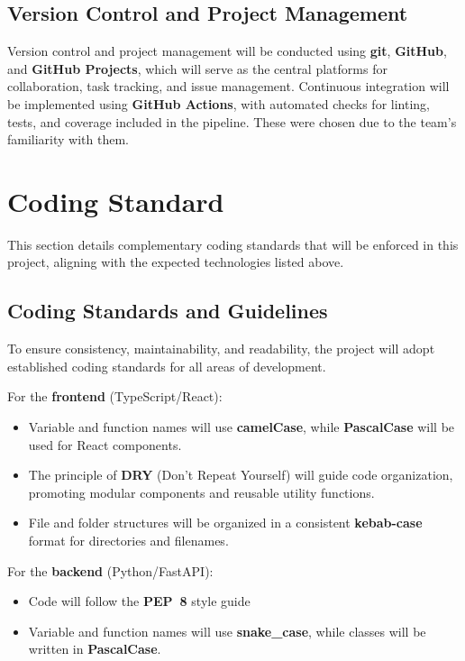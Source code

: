 \documentclass{article}
\begin{document}
\subsection{Version Control and Project Management}

Version control and project management will be conducted using \textbf{git}, \textbf{GitHub}, and \textbf{GitHub Projects}, which will serve as the central platforms for collaboration, task tracking, and issue management. Continuous integration will be implemented using \textbf{GitHub Actions}, with automated checks for linting, tests, and coverage included in the pipeline. These were chosen due to the team’s familiarity with them.


\section{Coding Standard}

This section details complementary coding standards that will be enforced in this project, 
aligning with the expected technologies listed above.\\

\subsection{Coding Standards and Guidelines}

To ensure consistency, maintainability, and readability, the project will adopt
established coding standards for all areas of development.

For the \textbf{frontend} (TypeScript/React):
\begin{itemize}

\item Variable and function names will use \textbf{camelCase}, while
  \textbf{PascalCase} will be used for React components.
  \item The principle of \textbf{DRY} (Don’t Repeat Yourself) will guide code
  organization, promoting modular components and reusable utility functions.
  \item File and folder structures will be organized in a consistent
  \textbf{kebab-case} format for directories and filenames.
\end{itemize}

For the \textbf{backend} (Python/FastAPI):
\begin{itemize}
  \item Code will follow the \textbf{PEP~8} style guide
  \item Variable and function names will use \textbf{snake\_case}, while classes
  will be written in \textbf{PascalCase}.
\end{itemize}
\end{document}
